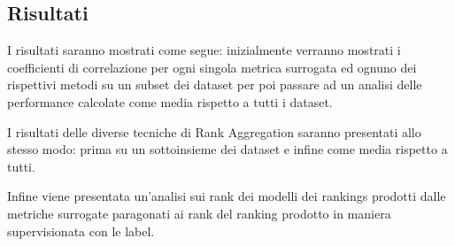 \subsection{Risultati}
I risultati saranno mostrati come segue: inizialmente verranno mostrati i coefficienti di correlazione per ogni singola metrica surrogata ed ognuno dei rispettivi metodi su un subset dei dataset per poi passare ad un analisi delle performance calcolate come media rispetto a tutti i dataset.

I risultati delle diverse tecniche di Rank Aggregation saranno presentati allo stesso modo: prima su un sottoinsieme dei dataset e infine come media rispetto a tutti.

Infine viene presentata un'analisi sui rank dei modelli dei rankings prodotti dalle metriche surrogate paragonati ai rank del ranking prodotto in maniera supervisionata con le label.
